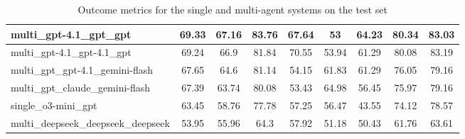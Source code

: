 \documentclass[manuscript, nonacm]{acmart}
\begin{document}
\begin{table}[h!]
\begin{tabular}{|l|c|c|c|c|c|c|c|c|}
\hline
multi\_gpt-4.1\_gpt\_gpt & 69.33 & 67.16 & 83.76 & 67.64 & 53 & 64.23 & 80.34 & 83.03 \\
\hline
multi\_gpt-4.1\_gpt-4.1\_gpt & 69.24 & 66.9 & 81.84 & 70.55 & 53.94 & 61.29 & 80.08 & 83.19 \\
\hline
multi\_gpt\_gpt-4.1\_gemini-flash & 67.65 & 64.6 & 81.14 & 54.15 & 61.83 & 61.29 & 76.05 & 79.16 \\
\hline
multi\_gpt\_claude\_gemini-flash & 67.39 & 63.74 & 80.08 & 53.43 & 64.98 & 56.45 & 75.97 & 79.16 \\
\hline
single\_o3-mini\_gpt & 63.45 & 58.76 & 77.78 & 57.25 & 56.47 & 43.55 & 74.12 & 78.57 \\
\hline
multi\_deepseek\_deepseek\_deepseek & 53.95 & 55.96 & 64.3 & 57.92 & 51.18 & 50.43 & 61.76 & 63.61 \\
\hline
\end{tabular}
\caption{Outcome metrics for the single and multi-agent systems on the test set}
\label{tab:model_performance}
\end{table}
\end{document}
